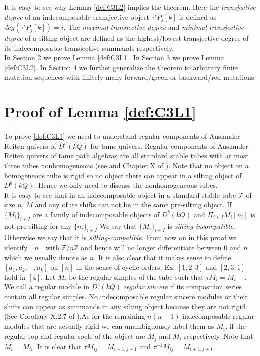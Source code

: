 \indent It is easy to see why Lemma \ref{def:C3L2} implies the theorem. Here the \textit{transjective degree} of an indecomposable transjective object $\tau^iP_j[k]$ is defined as $deg(\tau^iP_j[k])=i$. The \textit{maximal transjective degree} and \textit{minimal transjective degree} of a silting object are defined as the highest/lowest transjective degree of its indecomposable transjective summands respectively.\\
\indent In Section 2 we prove Lemma \ref{def:C3L1}. In Section 3 we prove Lemma \ref{def:C3L2}. In Section 4 we further generalize the theorem to arbitrary finite mutation sequences with finitely many forward/green or backward/red mutations.\\
\section{Proof of Lemma \ref{def:C3L1}}
\indent To prove \ref{def:C3L1} we need to understand regular components of Auslander-Reiten quivers of $D^b(kQ)$ for tame quivers. Regular components of Auslander-Reiten quivers of tame path algebras are all standard stable tubes with at most three tubes nonhomogeneous (see \cite{DR76} and Chapter X of \cite{SS06}). Note that no object on a homogeneous tube is rigid so no object there can appear in a silting object of $D^b(kQ)$. Hence we only need to discuss the nonhomogeneous tubes.\\
\indent It is easy to see that in an indecomposable object in a standard stable tube $\mathcal{T}$ of size $n$, $M$ and any of its shifts can not be in the same pre-silting object. If $\{M_i\}_{i\in I}$ are a family of indecomposable objects of $D^b(kQ)$ and $\Pi_{i\in I}M_i[n_i]$ is not pre-silting for any $\{n_i\}_{i\in I}$ We say that $\{M_i\}_{i\in I}$ is \textit{silting-incompatible}. Otherwise we say that it is \textit{silting-compatible}. From now on in this proof we identify $[n]$ with $\mathbb{Z}/n\mathbb{Z}$ and hence will no longer differentiate between $0$ and $n$ which we usually denote as $n$. It is also clear that it makes sense to define $[a_1, a_2,\cdots, a_k]$ on $[n]$ in the sense of cyclic orders. Ex: $[1,2,3]$ and $[2,3,1]$ hold in $[4]$. Let $M_i$ be the regular simples of the tube such that $\tau M_i=M_{i-1}$. We call a regular module in $D^b(kQ)$ \textit{regular sincere} if its composition series contain all regular simples. No indecomposable regular sincere modules or their shifts can appear as summands in any silting object because they are not rigid. (See Corollary X.2.7 of \cite{SS06}).As for the remaining $n(n-1)$ indecomposable regular modules that are actually rigid we can unambiguously label them as $M_{ij}$ if the regular top and regular socle of the object are $M_j$ and $M_i$ respectively. Note that $M_i=M_{ii}$. It is clear that $\tau M_{ij}=M_{i-1,j-1}$ and $\tau^{-1} M_{ij}=M_{i+1,j+1}$.\\
